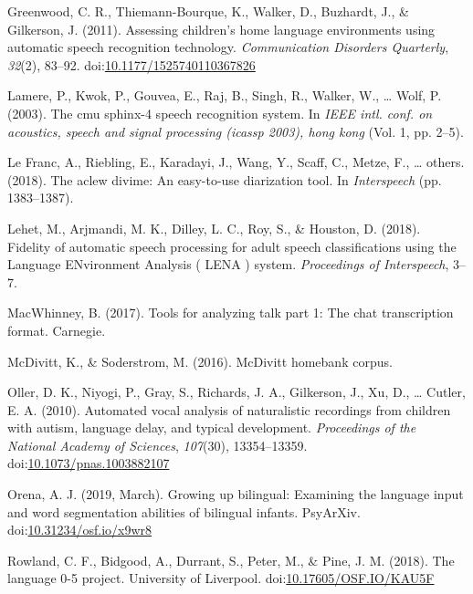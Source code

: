 \documentclass[english,floatsintext,man]{apa6}
\begin{document}
\hypertarget{ref-Greenwood2011}{}
Greenwood, C. R., Thiemann-Bourque, K., Walker, D., Buzhardt, J., \&
Gilkerson, J. (2011). Assessing children's home language environments
using automatic speech recognition technology. \emph{Communication
Disorders Quarterly}, \emph{32}(2), 83--92.
doi:\href{https://doi.org/10.1177/1525740110367826}{10.1177/1525740110367826}

\hypertarget{ref-lamere2003cmu}{}
Lamere, P., Kwok, P., Gouvea, E., Raj, B., Singh, R., Walker, W.,
\ldots{} Wolf, P. (2003). The cmu sphinx-4 speech recognition system. In
\emph{IEEE intl. conf. on acoustics, speech and signal processing
(icassp 2003), hong kong} (Vol. 1, pp. 2--5).

\hypertarget{ref-le2018aclew}{}
Le Franc, A., Riebling, E., Karadayi, J., Wang, Y., Scaff, C., Metze,
F., \ldots{} others. (2018). The aclew divime: An easy-to-use
diarization tool. In \emph{Interspeech} (pp. 1383--1387).

\hypertarget{ref-Lehet2018}{}
Lehet, M., Arjmandi, M. K., Dilley, L. C., Roy, S., \& Houston, D.
(2018). Fidelity of automatic speech processing for adult speech
classifications using the Language ENvironment Analysis ( LENA ) system.
\emph{Proceedings of Interspeech}, 3--7.

\hypertarget{ref-macwhinney2017tools}{}
MacWhinney, B. (2017). Tools for analyzing talk part 1: The chat
transcription format. Carnegie.

\hypertarget{ref-mcdivitt2016mcdivitt}{}
McDivitt, K., \& Soderstrom, M. (2016). McDivitt homebank corpus.

\hypertarget{ref-Oller}{}
Oller, D. K., Niyogi, P., Gray, S., Richards, J. A., Gilkerson, J., Xu,
D., \ldots{} Cutler, E. A. (2010). Automated vocal analysis of
naturalistic recordings from children with autism, language delay, and
typical development. \emph{Proceedings of the National Academy of
Sciences}, \emph{107}(30), 13354--13359.
doi:\href{https://doi.org/10.1073/pnas.1003882107}{10.1073/pnas.1003882107}

\hypertarget{ref-orena_2019}{}
Orena, A. J. (2019, March). Growing up bilingual: Examining the language
input and word segmentation abilities of bilingual infants. PsyArXiv.
doi:\href{https://doi.org/10.31234/osf.io/x9wr8}{10.31234/osf.io/x9wr8}

\hypertarget{ref-rowland2018}{}
Rowland, C. F., Bidgood, A., Durrant, S., Peter, M., \& Pine, J. M.
(2018). The language 0-5 project. University of Liverpool.
doi:\href{https://doi.org/10.17605/OSF.IO/KAU5F}{10.17605/OSF.IO/KAU5F}
\end{document}
